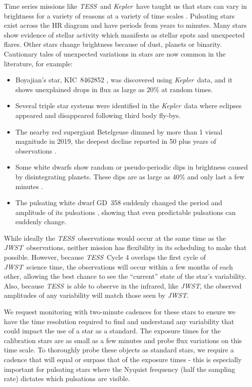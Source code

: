 \documentclass[letterpaper,12pt]{article}
\newcommand{\tess}{{\it TESS}}
\newcommand{\jwst}{{\it JWST}}
\newcommand{\kepler}{{\it Kepler}}
\begin{document}
Time series missions like \tess\ and \kepler\ have taught us that stars can vary in brightness for a variety of reasons at a variety of time scales \citep{Hermes2017}. Pulsating stars exist across the HR diagram and have periods from years to minutes. Many stars show evidence of stellar activity which manifests as stellar spots and unexpected flares. Other stars change brightness because of dust, planets or binarity.  Cautionary tales of unexpected variations in stars are now common in the literature, for example: 
\begin{itemize}
    \item  Boyajian's star, KIC~8462852 \citep{Boyajian2016}, was discovered using \kepler\ data, and it shows unexplained drops in flux as large as 20\% at random times.
    \item Several triple star systems were identified in the \kepler\ data \citep{Orosz2015} where eclipses appeared and disappeared following third body fly-bys. 
    \item The nearby red supergiant Betelgeuse \citep{Guinan2019} dimmed by more than 1 visual magnitude in 2019, the deepest decline reported in 50 plus years of observations \citep{Levesque2020ApJ}.
    \item Some white dwarfs show random or pseudo-periodic dips in brightness caused by disintegrating planets. These dips are as large as 40\% and only last a few minutes \citep{Vanderburg2015}.
    \item The pulsating white dwarf GD~358 suddenly changed the period and amplitude of its pulsations \citep{Montgomery2010}, showing that even predictable pulsations can suddenly change.
\end{itemize}

While ideally the \tess\ observations would occur at the same time as the \jwst\ observations, neither mission has flexibility in its scheduling to make that possible.  However, because \tess\ Cycle 4 overlaps the first cycle of \jwst\ science time, the observations will occur within a few months of each other, allowing the best chance to see the ``current'' state of the star's variability. Also, because \tess\ is able to observe in the infrared, like \jwst, the observed amplitudes of any variability will match those seen by \jwst.

We request monitoring with two-minute cadences for these stars to ensure we have the time resolution required to find and understand any variability that could impact the use of a star as a standard. The exposure times for the calibration stars are as small as a few minutes and probe flux variations on this time scale. To thoroughly probe these objects as standard stars, we require a cadence that will equal or surpass that of the exposure times - this is especially important for pulsating stars where the Nyquist frequency (half the sampling rate) dictates which pulsations are visible.
\end{document}
